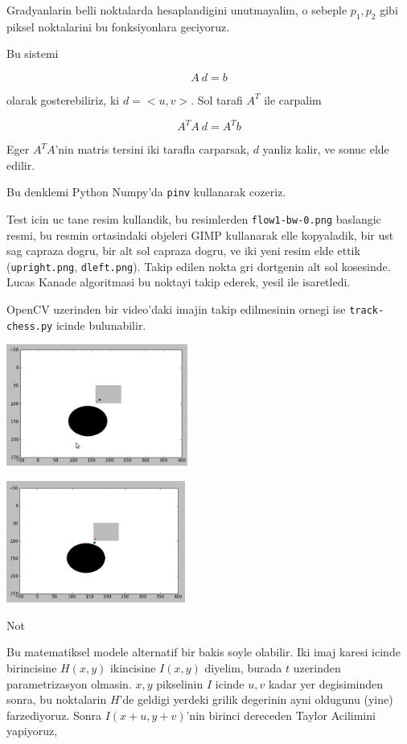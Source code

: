 \documentclass[12pt,fleqn]{article}
\begin{document}
Gradyanlarin belli noktalarda hesaplandigini unutmayalim, o sebeple $p_1,
p_2$ gibi piksel noktalarini bu fonksiyonlara geciyoruz. 

Bu sistemi

\[ A \ d = b \]

olarak gosterebiliriz, ki $d = <u,v>$. Sol tarafi $A^T$ ile carpalim

\[ A^TA \ d = A^Tb \]

Eger $A^TA$'nin matris tersini iki tarafla carparsak, $d$ yanliz kalir, ve
sonuc elde edilir. 

Bu denklemi Python Numpy'da \verb!pinv! kullanarak cozeriz.

Test icin uc tane resim kullandik, bu resimlerden \verb!flow1-bw-0.png!
baslangic resmi, bu resmin ortasindaki objeleri GIMP kullanarak elle
kopyaladik, bir ust sag capraza dogru, bir alt sol capraza dogru, ve iki
yeni resim elde ettik (\verb!upright.png!, \verb!dleft.png!). Takip edilen
nokta gri dortgenin alt sol kosesinde. Lucas Kanade algoritmasi bu noktayi
takip ederek, yesil ile isaretledi.

OpenCV uzerinden bir video'daki imajin takip edilmesinin ornegi ise
\verb!track-chess.py! icinde bulunabilir. 

\includegraphics[height=4cm]{res1.png}

\includegraphics[height=4cm]{res2.png}





Not

Bu matematiksel modele alternatif bir bakis soyle olabilir. Iki imaj karesi
icinde birincisine $H(x,y)$ ikincisine $I(x,y)$ diyelim, burada $t$
uzerinden parametrizasyon olmasin. $x,y$ pikselinin $I$ icinde $u,v$ kadar
yer degisiminden sonra, bu noktalarin $H$'de geldigi yerdeki grilik degerinin
ayni oldugunu (yine) farzediyoruz. Sonra $I(x+u,y+v)$'nin birinci
dereceden Taylor Acilimini yapiyoruz, 
\end{document}
